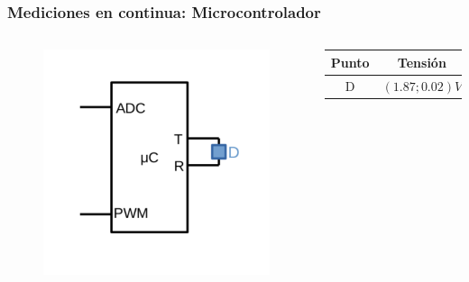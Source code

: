 \begin{frame}
\frametitle{Mediciones en continua: Microcontrolador}
	\begin{columns}[t]
		\begin{figure}
			\centering
			\includegraphics[scale=0.4]{MicroCon}	
		\end{figure}
		\begin{table}
			\centering
			\begin{tabular}{c|c}
				Punto & Tensión\\
				\hline \hline
				D & $(1.87;0.02)V$  \\
				\hline
			\end{tabular}
		\end{table}
	\end{columns}
\end{frame}

